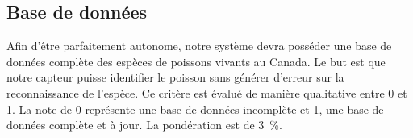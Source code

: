 

\subsection{Base de données}
\label{s:cdc_aut_basedonn}

Afin d’être parfaitement autonome, notre système devra posséder une base de données complète des espèces de poissons vivants au Canada.
Le but est que notre capteur puisse identifier le poisson sans générer d’erreur sur la reconnaissance de l’espèce.
Ce critère est évalué de manière qualitative entre 0 et 1.
La note de 0 représente une base de données incomplète et 1, une base de données complète et à jour.
La pondération est de 3~\%.